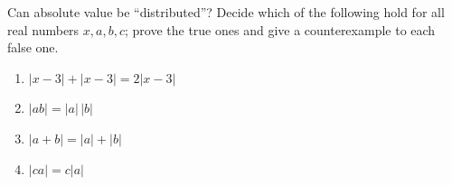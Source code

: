 Can absolute value be ``distributed''? Decide which of the following hold for all real numbers $x,a,b,c$; prove the true ones and give a counterexample to each false one.
\begin{enumerate}
\item[(a)] $|x-3|+|x-3|=2|x-3|$
\item[(b)] $|ab|=|a|\,|b|$
\item[(c)] $|a+b|=|a|+|b|$
\item[(d)] $|ca|=c|a|$
\end{enumerate}
